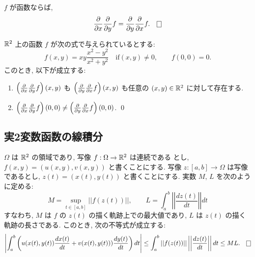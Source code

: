 \documentclass[12pt,twoside]{jarticle}
\begin{document}
\begin{question}
  $f$ が函数ならば, 
  \[
    \frac{\del}{\del x} \frac{\del}{\del y} f
    = \frac{\del}{\del y} \frac{\del}{\del x} f. \qed
  \]%
\end{question}

\begin{question}
  ${\mathbb R}^2$ 上の函数 $f$ が次の式で与えられているとする:
  \[
    f(x,y) = xy \frac{x^2-y^2}{x^2+y^2} 
    \quad\text{if} (x,y)\ne0,
    \qquad
    f(0,0) = 0.
  \]%
  このとき, 以下が成立する:
  \begin{enumerate}
  \item $\left(\frac{\partial}{\partial x}\frac{\partial}{\partial y}f\right)(x,y)$ も 
    $\left(\frac{\partial}{\partial y}\frac{\partial}{\partial x}f\right)(x,y)$ も任意の 
    $(x,y)\in{\mathbb R}^2$ に対して存在する. 
  \item $\left(\frac{\partial}{\partial x}\frac{\partial}{\partial y}f\right)(0,0) \ne
    \left(\frac{\partial}{\partial y} \frac{\partial}{\partial x}f\right)(0,0)$.  \qed
  \end{enumerate}
\end{question}



\subsection{実2変数函数の線積分}

\begin{question}
  $\Omega$ は ${\mathbb R}^2$ の領域であり, 写像 $f:\Omega\to{\mathbb R}^2$ は連続である
  とし, $f(x,y)=(u(x,y),v(x,y))$ と書くことにする. 写像 
  $z:[a,b]\to\Omega$ は写像であるとし, $z(t)=(x(t),y(t))$ 
  と書くことにする. 実数 $M$, $L$ を次のように定める:
  \[
    M = \sup_{t\in[a,b]}||f(z(t))||,
    \qquad
    L = \int_a^b \left|\left| \frac{dz(t)}{dt} \right|\right| dt
  \]%
  すなわち, $M$ は $f$ の $z(t)$ の描く軌跡上での最大値であり, $L$ は 
  $z(t)$ の描く軌跡の長さである. このとき, 次の不等式が成立する:
  \[
    \left| 
      \int_a^b 
      \left(
        u(x(t),y(t)) \frac{dx(t)}{dt} + v(x(t),y(t))) \frac{dy(t)}{dt}
      \right)
      dt
    \right|
    \le 
    \int_a^b 
      ||f(z(t))||
      \left|\left| \frac{dz(t)}{dt} \right|\right|
    dt
    \le
    ML. \qed
  \]%
\end{question}
\end{document}
